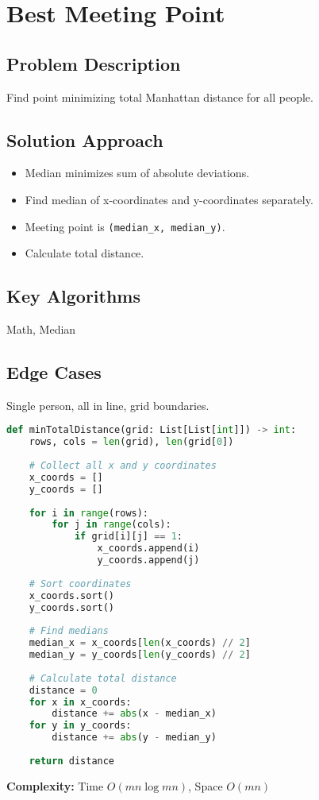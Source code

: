 \documentclass[10pt, a4paper]{article}
\begin{document}
\section{Best Meeting Point}
\subsection*{Problem Description}
Find point minimizing total Manhattan distance for all people.

\subsection*{Solution Approach}
\begin{itemize}
    \item Median minimizes sum of absolute deviations.
    \item Find median of x-coordinates and y-coordinates separately.
    \item Meeting point is \texttt{(median\_x, median\_y)}.
    \item Calculate total distance.
\end{itemize}

\subsection*{Key Algorithms}
Math, Median

\subsection*{Edge Cases}
Single person, all in line, grid boundaries.

\begin{lstlisting}[language=Python]
def minTotalDistance(grid: List[List[int]]) -> int:
    rows, cols = len(grid), len(grid[0])
    
    # Collect all x and y coordinates
    x_coords = []
    y_coords = []
    
    for i in range(rows):
        for j in range(cols):
            if grid[i][j] == 1:
                x_coords.append(i)
                y_coords.append(j)
    
    # Sort coordinates
    x_coords.sort()
    y_coords.sort()
    
    # Find medians
    median_x = x_coords[len(x_coords) // 2]
    median_y = y_coords[len(y_coords) // 2]
    
    # Calculate total distance
    distance = 0
    for x in x_coords:
        distance += abs(x - median_x)
    for y in y_coords:
        distance += abs(y - median_y)
    
    return distance
\end{lstlisting}
\textbf{Complexity:} Time $O(mn \log mn)$, Space $O(mn)$
\end{document}
